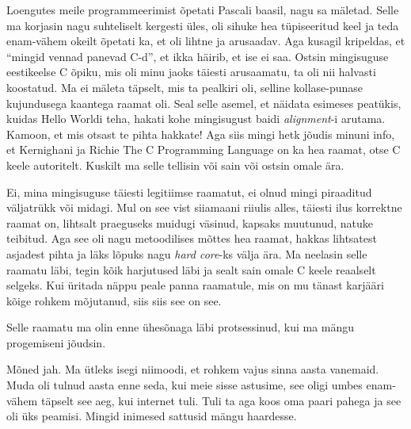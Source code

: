 Loengutes meile programmeerimist õpetati Pascali baasil, 
nagu sa mäletad. Selle ma korjasin nagu suhteliselt kergesti üles, oli sihuke 
hea tüpiseeritud keel ja teda enam-vähem okeilt õpetati ka, et oli lihtne ja 
arusaadav. Aga kusagil kripeldas, et \enquote{mingid vennad panevad C-d}, et 
ikka häirib, et ise ei saa. Ostsin mingisuguse eestikeelse C õpiku, mis oli 
minu jaoks täiesti arusaamatu, ta oli nii halvasti koostatud. Ma ei mäleta 
täpselt, mis ta pealkiri oli, selline kollase-punase kujundusega  kaantega 
raamat oli. Seal selle asemel, et näidata esimeses peatükis, kuidas Hello 
Worldi teha, hakati kohe mingisugust baidi \emph{alignment}-i 
 arutama.  Kamoon, et mis otsast te pihta hakkate! Aga siis mingi hetk 
jõudis minuni info, et Kernighani ja Richie The C Programming 
Language on ka hea raamat, otse C keele autoritelt. 
Kuskilt ma selle tellisin või sain või ostsin  omale ära. 


Ei, mina mingisuguse täiesti legitiimse raamatut, ei olnud mingi  
piraaditud väljatrükk või midagi. Mul on see vist siiamaani riiulis alles, 
täiesti ilus korrektne raamat on, lihtsalt praeguseks  muidugi väsinud, kapsaks 
muutunud, natuke teibitud. Aga see oli nagu metoodilises mõttes hea raamat,  
hakkas lihtsatest asjadest pihta ja läks lõpuks nagu \emph{hard core}-ks 
välja ära. Ma neelasin selle raamatu läbi, tegin kõik harjutused läbi ja 
sealt sain omale C keele reaalselt selgeks. Kui üritada näppu peale panna 
raamatule, mis on mu tänast karjääri kõige rohkem mõjutanud, siis siis see on 
see. 

Selle raamatu ma olin enne ühesõnaga läbi protsessinud, kui ma mängu 
progemiseni jõudsin.


Mõned jah. Ma ütleks isegi niimoodi, et rohkem vajus sinna aasta vanemaid. Muda 
oli  tulnud aasta enne seda, kui meie sisse astusime,  see oligi umbes 
enam-vähem täpselt see aeg, kui internet tuli. Tuli ta  aga koos oma paari 
pahega ja see oli üks peamisi. Mingid inimesed sattusid mängu haardesse.

